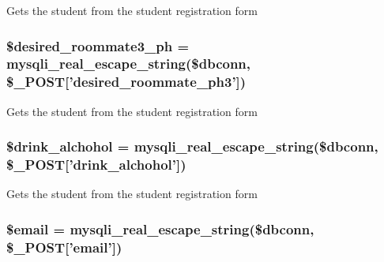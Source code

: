 \-Gets the student from the student registration form \hypertarget{admin__view_2validate_2studentVal_8php_a0e28d9f5935e6f64d0b142410bb2e5e6}{
\subsubsection[{\$desired\-\_\-roommate3\-\_\-ph}]{\setlength{\rightskip}{0pt plus 5cm}\$desired\-\_\-roommate3\-\_\-ph = mysqli\-\_\-real\-\_\-escape\-\_\-string(\$dbconn, \$\-\_\-\-P\-O\-S\-T\mbox{[}'desired\-\_\-roommate\-\_\-ph3'\mbox{]})}}\label{admin__view_2validate_2studentVal_8php_a0e28d9f5935e6f64d0b142410bb2e5e6}
\-Gets the student from the student registration form \hypertarget{admin__view_2validate_2studentVal_8php_a155e4a24650f8440d97423fe1d652eb7}{
\subsubsection[{\$drink\-\_\-alchohol}]{\setlength{\rightskip}{0pt plus 5cm}\$drink\-\_\-alchohol = mysqli\-\_\-real\-\_\-escape\-\_\-string(\$dbconn, \$\-\_\-\-P\-O\-S\-T\mbox{[}'drink\-\_\-alchohol'\mbox{]})}}\label{admin__view_2validate_2studentVal_8php_a155e4a24650f8440d97423fe1d652eb7}
\-Gets the student from the student registration form \hypertarget{admin__view_2validate_2studentVal_8php_ad634f418b20382e2802f80532d76d3cd}{
\subsubsection[{\$email}]{\setlength{\rightskip}{0pt plus 5cm}\$email = mysqli\-\_\-real\-\_\-escape\-\_\-string(\$dbconn, \$\-\_\-\-P\-O\-S\-T\mbox{[}'email'\mbox{]})}}\label{admin__view_2validate_2studentVal_8php_ad634f418b20382e2802f80532d76d3cd}
